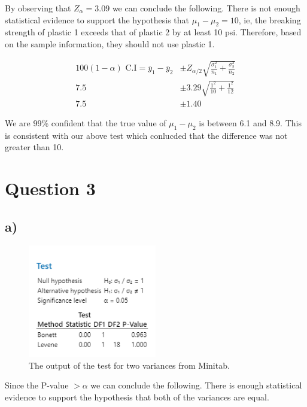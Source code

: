 \documentclass{article}
\begin{document}
By observing that $Z_{\alpha} = 3.09$ we can conclude the following.
There is not enough statistical evidence to support the hypothesis that $\mu_1 - \mu_2 = 10$,
ie, the breaking strength of plastic 1 exceeds that of plastic 2 by at least 10 psi.
Therefore, based on the sample information, they should not use plastic 1.

\begin{align*}
  100(1-\alpha) \text{ C.I} = \bar{y}_1 - \bar{y}_2&\pm Z_{\alpha/2} \sqrt{\frac{\sigma_1^2}{n_1} + \frac{\sigma_2^2}{n_2}} \\
  7.5                       &\pm 3.29 \sqrt{\frac{1^2}{10} + \frac{1^2}{12}} \\
  7.5                       &\pm 1.40
\end{align*}

We are 99\% confident that the true value of $\mu_1 - \mu_2$ is between 6.1 and 8.9.
This is consistent with our above test which conlucded that the difference was not greater than 10.
\clearpage
\section*{Question 3}

\subsection*{a)}
\begin{figure}[h]
    \centering
    \includegraphics[width=0.5\textwidth]{./images/3_a.png}
    \caption{The output of the test for two variances from Minitab.}
    \label{fig:3_a}
  \end{figure}
  Since the P-value $> \alpha$ we can conclude the following.
  There is enough statistical evidence to support the hypothesis that both of the variances are equal.
\end{document}

